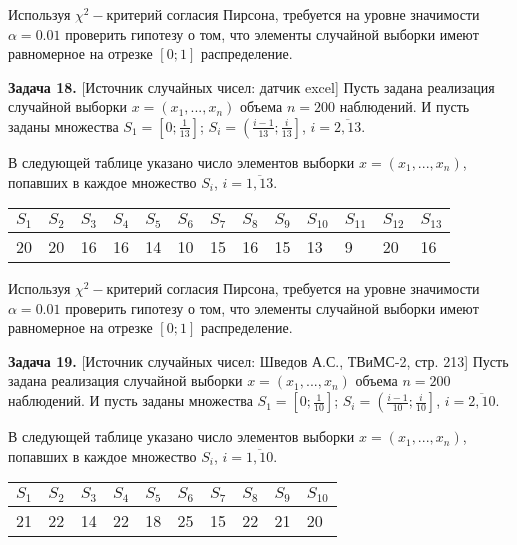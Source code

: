Используя $\chi ^{2} -$критерий согласия Пирсона, требуется на уровне значимости $\alpha =0.01$ проверить гипотезу о том, что элементы случайной выборки имеют равномерное на отрезке $\left[0;1\right]$ распределение.



\textbf{Задача 18.} [Источник случайных чисел: датчик excel] Пусть задана реализация случайной выборки $x=\left(x_{1} ,...,x_{n} \right)$ объема $n=200$ наблюдений. И пусть заданы множества $S_{1} =\left[0;{\tfrac{1}{13}} \right]$; $S_{i} =\left({\tfrac{i-1}{13}} ;{\tfrac{i}{13}} \right]$, $i=\overline{2,13}$. 

В следующей таблице указано число элементов выборки $x=\left(x_{1} ,...,x_{n} \right)$, попавших в каждое множество $S_{i} $, $i=\overline{1,13}$.

\begin{tabular}{|p{0.3in}|p{0.3in}|p{0.3in}|p{0.3in}|p{0.3in}|p{0.3in}|p{0.3in}|p{0.3in}|p{0.3in}|p{0.3in}|p{0.3in}|p{0.3in}|p{0.3in}|} \hline 
$S_{1} $ & $S_{2} $ & $S_{3} $ & $S_{4} $ & $S_{5} $ & $S_{6} $ & $S_{7} $ & $S_{8} $ & $S_{9} $ & $S_{10} $ & $S_{11} $ & $S_{12} $ & $S_{13} $ \\ \hline 
20 & 20 & 16 & 16 & 14 & 10 & 15 & 16 & 15 & 13 & 9 & 20 & 16 \\ \hline 
\end{tabular}



Используя $\chi ^{2} -$критерий согласия Пирсона, требуется на уровне значимости $\alpha =0.01$ проверить гипотезу о том, что элементы случайной выборки имеют равномерное на отрезке $\left[0;1\right]$ распределение.



\textbf{Задача 19.} [Источник случайных чисел: Шведов А.С., ТВиМС-2, стр. 213] Пусть задана реализация случайной выборки $x=\left(x_{1} ,...,x_{n} \right)$ объема $n=200$ наблюдений. И пусть заданы множества $S_{1} =\left[0;{\tfrac{1}{10}} \right]$; $S_{i} =\left({\tfrac{i-1}{10}} ;{\tfrac{i}{10}} \right]$, $i=\overline{2,10}$. 

В следующей таблице указано число элементов выборки $x=\left(x_{1} ,...,x_{n} \right)$, попавших в каждое множество $S_{i} $, $i=\overline{1,10}$.

\begin{tabular}{|p{0.3in}|p{0.3in}|p{0.3in}|p{0.3in}|p{0.3in}|p{0.3in}|p{0.3in}|p{0.3in}|p{0.3in}|p{0.3in}|} \hline 
$S_{1} $ & $S_{2} $ & $S_{3} $ & $S_{4} $ & $S_{5} $ & $S_{6} $ & $S_{7} $ & $S_{8} $ & $S_{9} $ & $S_{10} $ \\ \hline 
21 & 22 & 14 & 22 & 18 & 25 & 15 & 22 & 21 & 20 \\ \hline 
\end{tabular}



